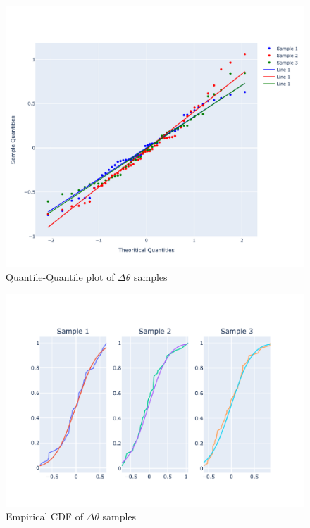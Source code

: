 \documentclass[
  digital, %
  table,   %
  twoside, %
  12pt,
  lof,     %
  lot,     %
]{fithesis3}
\begin{document}
\begin{figure}[h]
  \begin{center}
    \includegraphics[width=\textwidth]{images/theta-diff-qq.png}
  \end{center}
  \caption{Quantile-Quantile plot of $\Delta \theta$ samples}
  \label{fig:theta-diff-qq}
\end{figure}

\begin{figure}[h]
  \begin{center}
    \includegraphics[width=\textwidth]{images/theta-diff-ecdf.png}
  \end{center}
  \caption{Empirical CDF of $\Delta \theta$ samples}
  \label{fig:theta-diff-ecdf}
\end{figure}
\end{document}
